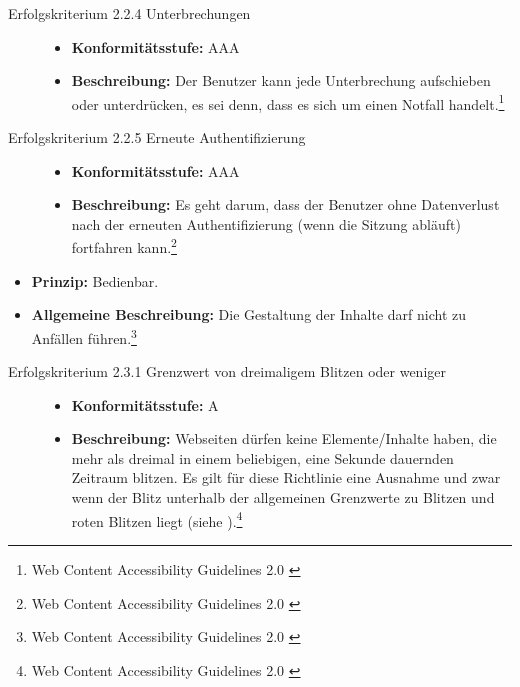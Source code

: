 \begin{description}
\begin{description}
		\item[Erfolgskriterium 2.2.4 Unterbrechungen]\hfill
		\begin{itemize}
			\item \textbf{Konformitätsstufe:} AAA
			\item \textbf{Beschreibung:} Der Benutzer kann jede Unterbrechung aufschieben oder unterdrücken, es sei denn, dass es sich um einen Notfall 
			handelt.\footnote{Web Content Accessibility Guidelines 2.0 \cite{WCAG2.0}}
		\end{itemize}
		
		\item[Erfolgskriterium 2.2.5 Erneute Authentifizierung]\hfill
		\begin{itemize}
			\item \textbf{Konformitätsstufe:} AAA
			\item \textbf{Beschreibung:} Es geht darum, dass der Benutzer ohne Datenverlust nach der erneuten Authentifizierung (wenn die Sitzung abläuft) 
			fortfahren kann.\footnote{Web Content Accessibility Guidelines 2.0 \cite{WCAG2.0}}
		\end{itemize}
	\end{description}
	
	\item [Richtlinie 2.3 Anfälle]\hfill
	\begin{itemize}
		\item \textbf{Prinzip:} Bedienbar.
		\item \textbf{Allgemeine Beschreibung:} Die Gestaltung der Inhalte darf nicht zu Anfällen führen.\footnote{Web Content Accessibility Guidelines 2.0 \cite{WCAG2.0}}
	\end{itemize}
	
	\begin{description}
		\item[Erfolgskriterium 2.3.1 Grenzwert von dreimaligem Blitzen oder weniger]\hfill
		\begin{itemize}
			\item \textbf{Konformitätsstufe:} A
			\item \textbf{Beschreibung:} Webseiten dürfen keine Elemente/Inhalte haben, die mehr als dreimal in einem beliebigen, eine Sekunde dauernden Zeitraum 
			blitzen. Es gilt für diese Richtlinie eine Ausnahme und zwar wenn der Blitz unterhalb der allgemeinen Grenzwerte zu Blitzen und roten Blitzen liegt
			(siehe ).\footnote{Web Content Accessibility Guidelines 2.0 \cite{WCAG2.0}}
		\end{itemize}
		

\end{description}
\end{description}
